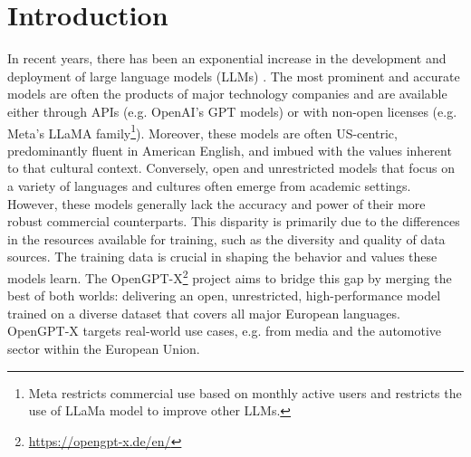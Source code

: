 \section{Introduction}\label{sec.introduction}
In recent years, there has been an exponential increase in the development and deployment of 
large language models (LLMs) \cite{abdalla-etal-2023-elephant,abs-2405-14487}. The most 
prominent and accurate models are often the products of major technology companies and 
are available either through APIs (e.g. OpenAI's GPT models) or with non-open licenses 
(e.g. Meta's LLaMA family\footnote{Meta restricts commercial use based on monthly active users and restricts the use of LLaMa model to improve other LLMs.%
}).
Moreover, these models are often US-centric, predominantly 
fluent in American English, and imbued with the values inherent to that cultural context.
Conversely, open and unrestricted models that focus on a variety of languages and 
cultures often emerge from academic settings. However, these models generally lack the 
accuracy and power of their more robust commercial counterparts. 
This disparity is primarily due to the differences in the resources available for 
training, such as the diversity and quality of data sources. The training data is 
crucial in shaping the behavior and values these models learn.
The OpenGPT-X\footnote{\url{https://opengpt-x.de/en/}} project aims to bridge this 
gap by merging the best of both worlds: delivering an open, unrestricted, high-performance 
model trained on a diverse dataset that covers all major European languages. OpenGPT-X targets 
real-world use cases, e.g. from media and the automotive sector within the European Union.

